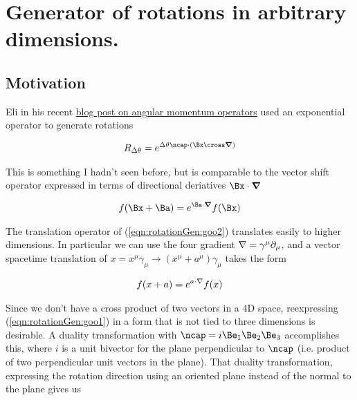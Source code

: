 

\chapter{Generator of rotations in arbitrary dimensions.}
\label{chap:rotationGenerator}
{}
\date{Aug 31, 2009}

\beginArtNoToc

\section{Motivation}

Eli in his recent \href{http://behindtheguesses.blogspot.com/2009/08/noncommuting-rotation-and-angular.html}{blog post on angular momentum operators} used an exponential operator to generate rotations

\begin{align}\label{eqn:rotationGen:goo1}
R_{\Delta\theta} = e^{\Delta\theta \ncap \cdot (\Bx \cross \spacegrad)}
\end{align}

This is something I hadn't seen before, but is comparable to the vector shift operator expressed in terms of directional deriatives $\Bx \cdot \spacegrad$

\begin{align}\label{eqn:rotationGen:goo2}
f(\Bx + \Ba) = e^{\Ba \cdot \spacegrad} f(\Bx)
\end{align}

The translation operator of (\ref{eqn:rotationGen:goo2}) translates easily to higher dimensions.  In particular we can use the four gradient $\nabla = \gamma^\mu \partial_\mu$, and a vector spacetime translation of $x = x^\mu \gamma_\mu \rightarrow (x^\mu + a^\mu) \gamma_\mu$ takes the form

\begin{align}\label{eqn:rotationGen:goo3}
f(x + a) = e^{a \cdot \nabla} f(x)
\end{align}

Since we don't have a cross product of two vectors in a 4D space, reexpressing (\ref{eqn:rotationGen:goo1}) in a form that is not tied to three dimensions is desirable.  A duality transformation with $\ncap = i \Be_1 \Be_2 \Be_3$ accomplishes this, where $i$ is a unit bivector for the plane perpendicular to $\ncap$ (i.e. product of two perpendicular unit vectors in the plane).  That duality transformation, expressing the rotation direction using an oriented plane instead of the normal to the plane gives us

